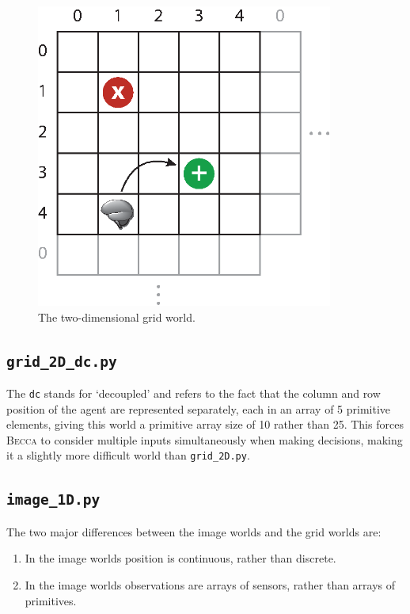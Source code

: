 \begin{figure}
\centering
\includegraphics[height=10cm]{figs/grid_world_2D.eps}
\caption{The two-dimensional grid world.}
\label{grid_2D}
\end{figure}

\subsection{\texttt{grid\_2D\_dc.py}}

The \texttt{dc} stands for `decoupled' and refers to the fact that the column and row position of the agent are represented separately, each in an array of 5 primitive elements, giving this world a primitive array size of 10 rather than 25. This forces \textsc{Becca} to consider multiple inputs simultaneously when making decisions, making it a slightly more difficult world than \texttt{grid\_2D.py}.

\subsection{\texttt{image\_1D.py}}

The two major differences between the image worlds and the grid worlds are:

\begin{enumerate}
\item In the image worlds position is continuous, rather than discrete.
\item In the image worlds observations are arrays of sensors, rather than arrays of primitives.
\end{enumerate}

